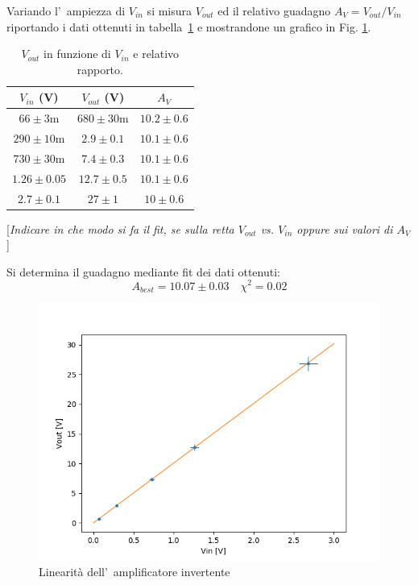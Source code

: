 \documentclass[10pt,a4paper]{article}
\newcommand{\rem}[1]{[\emph{#1}]}
\begin{document}
Variando l'~ampiezza di $V_{in}$ si misura $V_{out}$ ed il relativo guadagno $A_V=V_{out}/V_{in}$ riportando i dati ottenuti in tabella~\ref{tab:guadagno} 
e mostrandone un grafico in Fig. \ref{fig:lin}. 

\begin{table}[h]
\caption{$V_{out}$ in funzione di $V_{in}$ e relativo rapporto.}
\label{tab:guadagno}
\begin{center}
\begin{tabular}{|c|c|c|}
\hline
$V_{in}$ (V) & $V_{out}$ (V)  & $A_V$ \\
\hline
\hline
$66 \pm 3\mathrm{m} $ & $680 \pm 30\mathrm{m} $ & $10.2 \pm 0.6 $ \\
\hline
$290 \pm 10\mathrm{m} $ & $2.9 \pm 0.1 $ & $10.1 \pm 0.6 $ \\
\hline
$730 \pm 30\mathrm{m} $ & $7.4 \pm 0.3 $ & $10.1 \pm 0.6 $ \\
\hline
$1.26 \pm 0.05 $ & $12.7 \pm 0.5 $ & $10.1 \pm 0.6 $ \\
\hline
$2.7 \pm 0.1 $ & $27 \pm 1 $ & $10 \pm 0.6 $ \\
\hline
\end{tabular}
\end{center}
\end{table}

\rem{Indicare in che modo si fa il fit, se sulla retta $V_{out}$ vs. $V_{in}$ oppure sui valori di $A_V$   }

Si determina il guadagno mediante fit dei dati ottenuti:
\[
A_{best} = 10.07 \pm 0.03 \quad  \chi^2 = 0.02
\]
\begin{figure}[t]
\begin{center}
\includegraphics[width=0.8\linewidth]{1c.png}
\caption{\small Linearit\`a dell'~amplificatore invertente}
\label{fig:lin}
\end{center}
\end{figure}
%
\end{document}
